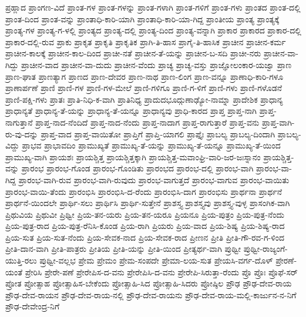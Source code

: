 ಪ್ರಹ್ಲಾದ
ಪ್ರಾಂಗಣ-ವಿದೆ
ಪ್ರಾಂತ-ಗಳ
ಪ್ರಾಂತ-ಗಳನ್ನು
ಪ್ರಾಂತ-ಗಳಾಗಿ
ಪ್ರಾಂತ-ಗಳಿಗೆ
ಪ್ರಾಂತ-ಗಳು
ಪ್ರಾಂತದ
ಪ್ರಾಂತ-ದಲ್ಲಿ
ಪ್ರಾಂತ-ದಿಂದ
ಪ್ರಾಂತ-ವನ್ನು
ಪ್ರಾಂತಾಧಿ-ಕಾರಿ-ಯಾಗಿ
ಪ್ರಾಂತಾಧಿ-ಕಾರಿ-ಯಾ-ಗಿದ್ದ
ಪ್ರಾಂತೀಯ
ಪ್ರಾಂತ್ಯ
ಪ್ರಾಂತ್ಯಕ್ಕೆ
ಪ್ರಾಂತ್ಯ-ಗಳ
ಪ್ರಾಂತ್ಯ-ಗ-ಳಲ್ಲಿ
ಪ್ರಾಂತ್ಯದ
ಪ್ರಾಂತ್ಯ-ದಲ್ಲಿ
ಪ್ರಾಂತ್ಯ-ದಿಂದ
ಪ್ರಾಂತ್ಯ-ವನ್ನಾಗಿ
ಪ್ರಾಕಾರ
ಪ್ರಾಕಾರದ
ಪ್ರಾಕಾರ-ದಲ್ಲಿ
ಪ್ರಾಕಾರ-ದಲ್ಲಿ-ರುವ
ಪ್ರಾಕು
ಪ್ರಾಕೃತ
ಪ್ರಾಕೃತಿ
ಪ್ರಾಕೃತಿಕ
ಪ್ರಾಗಿ-ತಿ-ಹಾಸ
ಪ್ರಾಗೈ-ತಿ-ಹಾಸಿಕ
ಪ್ರಾಚೀನ
ಪ್ರಾಚೀನ-ಕರ್ಮ
ಪ್ರಾಚೀನ-ಕಾಲಕ್ಕೆ
ಪ್ರಾಚೀನ-ಕಾಲ-ದಿಂದ
ಪ್ರಾಚೀ-ನತೆ
ಪ್ರಾಚೀನ-ತೆ-ಯನ್ನು
ಪ್ರಾಚೀನ-ಬ-ಸದಿ
ಪ್ರಾಚೀ-ನರು
ಪ್ರಾಚೀನ-ವಾ-ಗಿದ್ದು
ಪ್ರಾಚೀನ-ವಾದ
ಪ್ರಾಚೀನ-ವಾ-ದುದು
ಪ್ರಾಚೀನ-ವೆಂದು
ಪ್ರಾಚ್ಯ
ಪ್ರಾಚ್ಯ-ವಸ್ತು
ಪ್ರಾಜ್ಞೋಲಂಕಾರ-ಯಜ್ವಾ
ಪ್ರಾಣ
ಪ್ರಾಣ-ಘಾತ
ಪ್ರಾಣತ್ಯಾಗ
ಪ್ರಾಣದ
ಪ್ರಾಣ-ದೇವರ
ಪ್ರಾಣ-ನಾಥ
ಪ್ರಾಣ-ಲಿಂಗ
ಪ್ರಾಣ-ವನ್ನೂ
ಪ್ರಾಣಾಧಿ-ಕಾರಿ-ಗಳೂ
ಪ್ರಾಣಾರ್ಪಣೆ
ಪ್ರಾಣಿ
ಪ್ರಾಣಿ-ಗಳ
ಪ್ರಾಣಿ-ಗಳ-ಮೇಲೆ
ಪ್ರಾಣಿ-ಗಳಿಗೂ
ಪ್ರಾಣಿ-ಗ-ಳಿಗೆ
ಪ್ರಾಣಿ-ಗಳು
ಪ್ರಾಣಿ-ಗಳೊಡನೆ
ಪ್ರಾಣಿ-ಪಕ್ಷಿ-ಗಳು
ಪ್ರಾತಃ
ಪ್ರಾತಿ-ನಿಧಿ-ಕ-ವಾಗಿ
ಪ್ರಾತಿನಿಧ್ಯ
ಪ್ರಾದುದಭೂದ್ಗುಣಾಢ್ಯೋ-ನಾಮ್ನಾ
ಪ್ರಾದೇಶಿಕ
ಪ್ರಾಧಾನ್ಯ
ಪ್ರಾಧಾನ್ಯತೆ
ಪ್ರಾಧಾನ್ಯ-ತೆ-ಯನ್ನು
ಪ್ರಾಧಾನ್ಯ-ತೆ-ಯನ್ನೂ
ಪ್ರಾಧಾನ್ಯವು
ಪ್ರಾಧಿ-ಕಾರದ
ಪ್ರಾಪ್ತ
ಪ್ರಾಪ್ತ-ನಾಗಿ
ಪ್ರಾಪ್ತ-ನಾಗುತ್ತಾನೆ
ಪ್ರಾಪ್ತ-ನಾದ-ನೆಂದಿದೆ
ಪ್ರಾಪ್ತ-ನಾದ-ನೆಂದು
ಪ್ರಾಪ್ತ-ನಾದಾಗ
ಪ್ರಾಪ್ತ-ರಾಗುತ್ತಾರೆ
ಪ್ರಾಪ್ತ-ವನು
ಪ್ರಾಪ್ತ-ವಾಗಿ-ರು-ವು-ದನ್ನು
ಪ್ರಾಪ್ತ-ವಾದ
ಪ್ರಾಪ್ತ-ವಾಯಿತೋ
ಪ್ರಾಪ್ತಿಗೆ
ಪ್ರಾಪ್ತಿ-ಯಾಗಲಿ
ಪ್ರಾಪ್ತೈಃ
ಪ್ರಾಬಲ್ಯ
ಪ್ರಾಬಲ್ಯ-ದಿಂದಾಗಿ
ಪ್ರಾಬಲ್ಯ-ವಿದ್ದು
ಪ್ರಾಭವ
ಪ್ರಾಭಾವದಿಂ
ಪ್ರಾಮುಖ್ಯತೆ
ಪ್ರಾಮುಖ್ಯ-ತೆ-ಯನ್ನು
ಪ್ರಾಮುಖ್ಯ-ತೆ-ಯನ್ನೂ
ಪ್ರಾಮುಖ್ಯ-ತೆ-ಯಿಂದ
ಪ್ರಾಮುಖ್ಯ-ವಾಗಿ
ಪ್ರಾಯಶಃ
ಪ್ರಾಯಶ್ಚಿತ್ತ
ಪ್ರಾಯಶ್ಚಿತ್ತಕ್ಕಾಗಿ
ಪ್ರಾಯಶ್ಚಿತ್ತ-ಮವಾಂಘ್ರಿ-ವಾರಿ-ಜರ-ಜಃಸ್ನಾನಂ
ಪ್ರಾಯಶ್ಚಿತ್ತ-ವನ್ನು
ಪ್ರಾರಂಭ
ಪ್ರಾರಂಭ-ಗೊಂಡ
ಪ್ರಾರಂಭ-ಗೊಂಡಿತು
ಪ್ರಾರಂಭದ
ಪ್ರಾರಂಭ-ದಲ್ಲಿ
ಪ್ರಾರಂಭ-ವಾಗಿ
ಪ್ರಾರಂಭ-ವಾ-ಗಿದ್ದ
ಪ್ರಾರಂಭ-ವಾಗಿ-ರುವ
ಪ್ರಾರಂಭ-ವಾಗಿ-ರುವುದು
ಪ್ರಾರಂಭ-ವಾಗುತ್ತದೆ
ಪ್ರಾರಂಭ-ವಾಗುವ
ಪ್ರಾರಂಭ-ವಾಯಿತು
ಪ್ರಾರಂಭ-ವಾಯಿ-ತೆಂದು
ಪ್ರಾರಂಭಿಸಿ
ಪ್ರಾರಂಭಿಸಿ-ದ-ರೆಂದು
ಪ್ರಾರಂಭಿಸಿ-ದಾಗ
ಪ್ರಾರಂಭಿಸು
ಪ್ರಾರ್ಥನಾ
ಪ್ರಾರ್ಥನೆ
ಪ್ರಾರ್ಥನೆ-ಯಿಂದಲೇ
ಪ್ರಾರ್ಥಿ-ಸಲು
ಪ್ರಾರ್ಥಿಸಿ
ಪ್ರಾರ್ಥಿ-ಸುತ್ತೇನೆ
ಪ್ರಾಶಸ್ತ್ಯ
ಪ್ರಾಶಸ್ತ್ಯವು
ಪ್ರಾಶಸ್ತ್ಯ-ವುಳ್ಳ
ಪ್ರಾಸಂಗಿಕ-ವಾಗಿ
ಪ್ರಿಥುವಿಯ
ಪ್ರಿಥುವೀ
ಪ್ರಿಥ್ವೀ
ಪ್ರಿಯ-ತನ-ಯರು
ಪ್ರಿಯ-ತನ-ಯರೂ
ಪ್ರಿಯನೂ
ಪ್ರಿಯ-ಪುತ್ರಂ
ಪ್ರಿಯ-ಪುತ್ರ-ನೆಂದು
ಪ್ರಿಯ-ಪುತ್ರ-ರಾದ
ಪ್ರಿಯ-ಪುತ್ರ-ರೆನಿಸಿ-ಕೊಂಡ
ಪ್ರಿಯ-ರಾಗಿ
ಪ್ರಿಯರು
ಪ್ರಿಯ-ವಾದ
ಪ್ರಿಯ-ಶಿಷ್ಯ
ಪ್ರಿಯ-ಶಿಷ್ಯ-ರಾದ
ಪ್ರಿಯ-ಸುತ
ಪ್ರಿಯ-ಸುತ-ನೆಂದು
ಪ್ರಿಯ-ಸೇವಕ-ನಾದ
ಪ್ರಿಯ-ಸೇವಕ-ರಾದ
ಪ್ರೀಣನ
ಪ್ರೀತಿ
ಪ್ರೀತಿ-ಗೌ-ರವ-ಗ-ಳಿಂದ
ಪ್ರೀತಿ-ದಾನ-ವಾಗಿ
ಪ್ರೀತಿ-ಪಾತ್ರರು
ಪ್ರೀತಿಯ
ಪ್ರೀತಿ-ಯನ್ನು
ಪ್ರೀತಿ-ಯಿಂದ
ಪ್ರೀತ್ಯರ್ಥ-ವಾಗಿ
ಪ್ರುಥ್ವೀ
ಪ್ರುಥ್ವೀ-ರಾಜ್ಯಂಗೆ-ಯುತ್ತಿ-ರಲು
ಪ್ರುಥ್ವೀ-ವಲ್ಲಭ
ಪ್ರೇಮ
ಪ್ರೇಮಂ
ಪ್ರೇಮ-ಸಂಪದೇ
ಪ್ರೇಮಾ-ಲಯ-ಸುತ
ಪ್ರೇಯಸಿ-ವರ್ಗ-ದೊಳ್
ಪ್ರೇರಣೆ-ಯಂತೆ
ಪ್ರೇರಿಸಿ
ಪ್ರೇರೇ-ಪಣೆ
ಪ್ರೇರೇಪಿಸ-ದ-ವನು
ಪ್ರೇರೇಪಿಸಿ-ದ-ವನು
ಪ್ರೇರೇಪಿ-ಸಿರುತ್ತಾ-ರೆಂದು
ಪ್ರೊ
ಪ್ರೊಃ
ಪ್ರೊಫೆ-ಸರ್
ಪ್ರೋತ
ಪ್ರೋತ್ಸಾಹ
ಪ್ರೋತ್ಸಾಹಿಸ-ಬೇಕೆಂದು
ಪ್ರೋತ್ಸಾಹಿ-ಸಿದ
ಪ್ರೋತ್ಸಾಹಿ-ಸಿದರು
ಪ್ರೋಷ್ಠಿಲ
ಪ್ರೌಢ
ಪ್ರೌಢ-ದೇವ-ರಾಯ
ಪ್ರೌಢ-ದೇವ-ರಾಯನ
ಪ್ರೌಢ-ದೇವ-ರಾಯ-ನಲ್ಲಿ
ಪ್ರೌಢ-ದೇವ-ರಾಯನು
ಪ್ರೌಢ-ದೇವ-ರಾಯ-ಮಲ್ಲಿ-ಕಾರ್ಜುನ-ನ-ನಿಗೆ
ಪ್ರೌಢ-ದೇವೇಂದ್ರ-ನಿಗೆ
